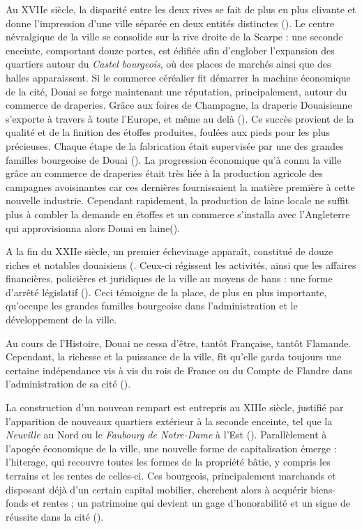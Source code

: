 Au XVIIe siècle, la disparité entre les deux rives se fait de plus en plus clivante et donne l'impression d'une ville séparée en deux entités distinctes (\cite{leroy-langelin_quartier_2012}). 
Le centre névralgique de la ville se consolide sur la rive droite de la Scarpe : une seconde enceinte, comportant douze portes, est édifiée afin d'englober l'expansion des quartiers autour du \textit{Castel bourgeois}, où des places de marchés ainsi que des halles apparaissent. 
Si le commerce céréalier fit démarrer la machine économique de la cité, Douai se forge maintenant une réputation, principalement, autour du commerce de draperies. Grâce aux foires de Champagne, la draperie Douaisienne s'exporte à travers à toute l'Europe, et même au delà (\cite{clisant_vie_2003}). Ce succès provient de la qualité et de la finition des étoffes produites, foulées aux pieds pour les plus précieuses. Chaque étape de la fabrication était supervisée par une des grandes familles bourgeoise de Douai (\cite{clisant_vie_2003}).
La progression économique qu'à connu la ville grâce au commerce de draperies était très liée à la production agricole des campagnes avoisinantes car ces dernières fournissaient la matière première à cette nouvelle industrie.
Cependant rapidement, la production de laine locale ne suffit plus à combler la demande en étoffes et un commerce s'installa avec l'Angleterre qui approvisionna alors Douai en laine(\cite{clisant_vie_2003}).

A la fin du XXIIe siècle, un premier échevinage apparaît, constitué de douze riches et notables douaisiens (\cite{mestayer_douai_2016}. Ceux-ci régissent les activités, ainsi que les affaires financières, policières et juridiques  de la ville au moyens de bans : une forme d'arrêté législatif (\cite{officedutourisme_douai_2016}). Ceci témoigne de la place, de plus en plus importante, qu'occupe les grandes familles bourgeoise dans l'administration et le développement de la ville.

Au cours de l'Histoire, Douai ne cessa d'être, tantôt Française, tantôt Flamande. Cependant, la richesse et la puissance de la ville, fît  qu'elle garda toujours une certaine indépendance vis à vis du rois de France ou du Compte de Flandre dans l'administration de sa cité (\cite{mestayer_douai_2016}).

La construction d'un nouveau rempart est entrepris au XIIIe siècle, justifié par l'apparition de nouveaux quartiers extérieur à la seconde enceinte, tel que la \textit{Neuville} au  Nord ou le \textit{Faubourg de Notre-Dame} à l'Est (\cite{netteghem_histoire_2021}).
Parallèlement à l'apogée économique de la ville, une nouvelle forme de capitalisation émerge : l'hiterage, qui recouvre toutes les formes de la propriété bâtie, y compris les terrains et les rentes de celles-ci. Ces bourgeois, principalement marchands et disposant déjà d'un certain capital mobilier, cherchent alors à acquérir biens-fonds et rentes ; un patrimoine qui devient un gage d'honorabilité et un signe de réussite dans la cité  (\cite{leguay_propriete_1989}). 


